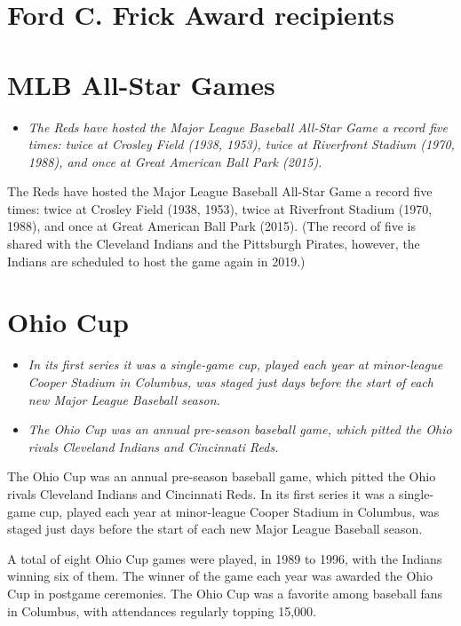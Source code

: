 \section{Ford C. Frick Award
recipients}\label{ford-c.-frick-award-recipients}

\section{MLB All-Star Games}\label{mlb-all-star-games}

\begin{itemize}
\item
  \emph{The Reds have hosted the Major League Baseball All-Star Game a
  record five times: twice at Crosley Field (1938, 1953), twice at
  Riverfront Stadium (1970, 1988), and once at Great American Ball Park
  (2015).}
\end{itemize}

The Reds have hosted the Major League Baseball All-Star Game a record
five times: twice at Crosley Field (1938, 1953), twice at Riverfront
Stadium (1970, 1988), and once at Great American Ball Park (2015). (The
record of five is shared with the Cleveland Indians and the Pittsburgh
Pirates, however, the Indians are scheduled to host the game again in
2019.)

\section{Ohio Cup}\label{ohio-cup}

\begin{itemize}
\item
  \emph{In its first series it was a single-game cup, played each year
  at minor-league Cooper Stadium in Columbus, was staged just days
  before the start of each new Major League Baseball season.}
\item
  \emph{The Ohio Cup was an annual pre-season baseball game, which
  pitted the Ohio rivals Cleveland Indians and Cincinnati Reds.}
\end{itemize}

The Ohio Cup was an annual pre-season baseball game, which pitted the
Ohio rivals Cleveland Indians and Cincinnati Reds. In its first series
it was a single-game cup, played each year at minor-league Cooper
Stadium in Columbus, was staged just days before the start of each new
Major League Baseball season.

A total of eight Ohio Cup games were played, in 1989 to 1996, with the
Indians winning six of them. The winner of the game each year was
awarded the Ohio Cup in postgame ceremonies. The Ohio Cup was a favorite
among baseball fans in Columbus, with attendances regularly topping
15,000.

